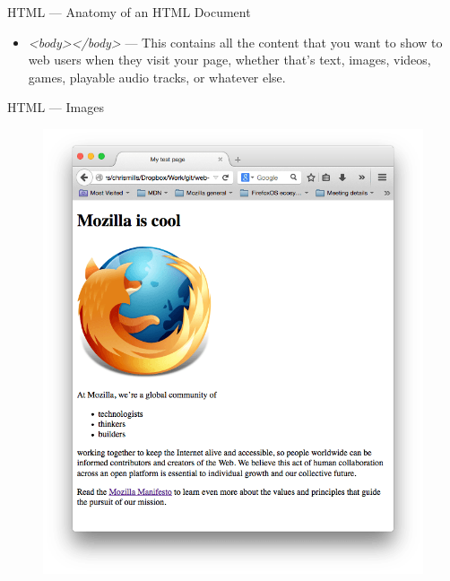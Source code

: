 \documentclass[aspectratio=169]{beamer}
\begin{document}
\begin{darkframes}
    \begin{frame}{HTML — Anatomy of an HTML Document}
        \firstWebPage
        \begin{itemize}
            \item \textit{<body></body>} — This contains all the content that you want to show to web users when they visit your page, whether that's text, images, videos, games, playable audio tracks, or whatever else.
        \end{itemize}
    \end{frame}
        
    
    \begin{frame}{HTML — Images}
        \begin{figure}[h]
           \begin{flushleft} \includegraphics[width=0.35\linewidth]{resources/finished-test-page-small.png}
           \end{flushleft}
        \end{figure}
        \htmlImage
    \end{frame}
    

\end{darkframes}
\end{document}

